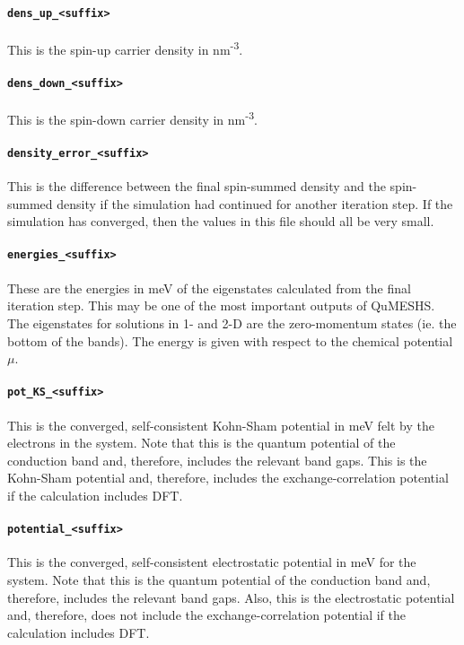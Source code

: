 \documentclass[12pt]{article}
\begin{document}
\paragraph{\texttt{dens\_up\_<suffix>}}
This is the spin-up carrier density in nm\textsuperscript{-3}.

\paragraph{\texttt{dens\_down\_<suffix>}}
This is the spin-down carrier density in nm\textsuperscript{-3}.

\paragraph{\texttt{density\_error\_<suffix>}}
This is the difference between the final spin-summed density and the spin-summed density
if the simulation had continued for another iteration step.  If the simulation has
converged, then the values in this file should all be very small.

\paragraph{\texttt{energies\_<suffix>}}
These are the energies in meV of the eigenstates calculated from the final iteration step.
This may be one of the most important outputs of QuMESHS.  The eigenstates for solutions
in 1- and 2-D are the zero-momentum states (ie. the bottom of the bands).  The energy is
given with respect to the chemical potential $\mu$.

\paragraph{\texttt{pot\_KS\_<suffix>}}
This is the converged, self-consistent Kohn-Sham potential in meV felt by the electrons in
the system.  Note that this is the quantum potential of the conduction band and, therefore,
includes the relevant band gaps.  This is the Kohn-Sham potential and, therefore, includes
the exchange-correlation potential if the calculation includes DFT.

\paragraph{\texttt{potential\_<suffix>}}
This is the converged, self-consistent electrostatic potential in meV
for the system.  Note that this is the quantum potential of the conduction band and,
therefore, includes the relevant band gaps.  Also, this is the electrostatic potential
and, therefore, does not include the exchange-correlation potential if the calculation
includes DFT.
\end{document}
